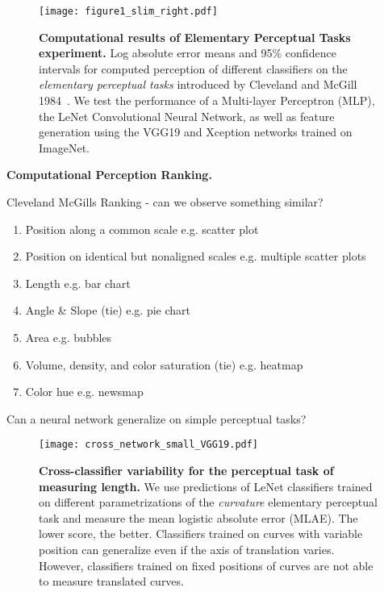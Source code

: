 \begin{figure}[h]
	\centering
	  \texttt{[image: figure1\_slim\_right.pdf]}
  \caption{\textbf{Computational results of Elementary Perceptual Tasks experiment.} Log absolute error means and 95\% confidence intervals for computed perception of different classifiers on the \emph{elementary perceptual tasks} introduced by Cleveland and McGill 1984~\cite{cleveland_mcgill}. We test the performance of a Multi-layer Perceptron (MLP), the LeNet Convolutional Neural Network, as well as feature generation using the VGG19 and Xception networks trained on ImageNet.}
	\label{fig:figure1_results}
\end{figure}

\textbf{Computational Perception Ranking.}

Cleveland McGills Ranking - can we observe something similar?

\begin{enumerate}
	\item Position along a common scale e.g. scatter plot
	\item Position on identical but nonaligned scales e.g. multiple scatter plots
	\item Length e.g. bar chart
	\item Angle \& Slope (tie) e.g. pie chart
	\item Area e.g. bubbles
	\item Volume, density, and color saturation (tie) e.g. heatmap
	\item Color hue e.g. newsmap
\end{enumerate}


Can a neural network generalize on simple perceptual tasks?

\begin{figure}[t]
	  \texttt{[image: cross\_network\_small\_VGG19.pdf]}
  \caption{\textbf{Cross-classifier variability for the perceptual task of measuring length.} We use predictions of LeNet classifiers trained on different parametrizations of the \emph{curvature} elementary perceptual task and measure the mean logistic absolute error (MLAE). The lower score, the better. Classifiers trained on curves with variable position can generalize even if the axis of translation varies. However, classifiers trained on fixed positions of curves are not able to measure translated curves.}
	\label{fig:cross_network}
\end{figure}
